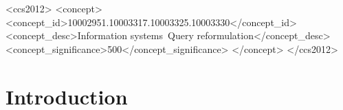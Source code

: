 \documentclass[sigconf,screen]{acmart}
\begin{document}

\begin{CCSXML}
<ccs2012>
<concept>
<concept_id>10002951.10003317.10003325.10003330</concept_id>
<concept_desc>Information systems~Query reformulation</concept_desc>
<concept_significance>500</concept_significance>
</concept>
</ccs2012>
\end{CCSXML}




\maketitle

\section{Introduction}
\end{document}
